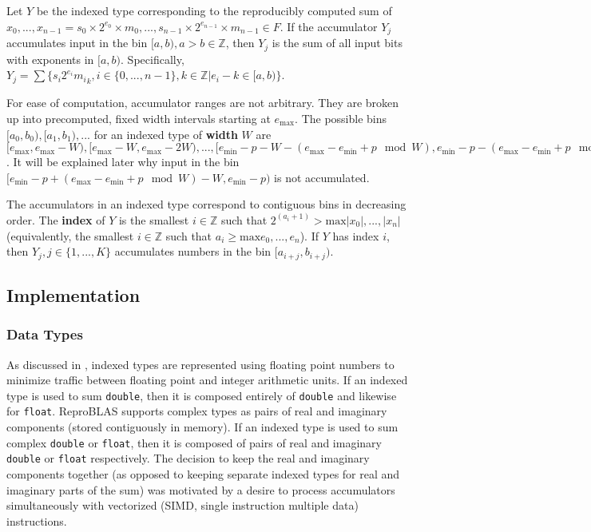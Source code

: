 \documentclass[12pt]{article}
\providecommand{\Z}{\ensuremath{\mathbb{Z}}}
\providecommand{\min}{\ensuremath{\text{min}}}
\providecommand{\max}{\ensuremath{\text{max}}}
\theoremstyle{plain}
\begin{document}
    Let $Y$ be the indexed type corresponding to the reproducibly computed sum of $x_0, ..., x_{n - 1} = s_0 \times 2^{e_0} \times m_0, ..., s_{n - 1} \times 2^{e_{n - 1}} \times m_{n - 1} \in F$.
    If the accumulator $Y_j$ accumulates input in the bin $[a, b), a > b \in \Z$, then $Y_j$ is the sum of all input bits with exponents in $[a, b)$. Specifically, $Y_j = \sum \{s_i2^{e_i}{m_i}_k, i \in \{0, ..., n - 1\}, k \in \Z | e_i - k \in [a, b)\}$.

    For ease of computation, accumulator ranges are not arbitrary. They are broken up into precomputed, fixed width intervals starting at $e_{\max}$. The possible bins $[a_0, b_0), [a_1, b_1), ...$ for an indexed type of \textbf{width} $W$ are $[e_{\max}, e_{\max} - W), [e_{\max} - W, e_{\max} - 2W), ..., [e_{\min} - p - W - (e_{\max} - e_{\min} + p \mod W), e_{\min} - p - (e_{\max} - e_{\min} + p \mod W))$. It will be explained later why input in the bin $[e_{\min} - p + (e_{\max} - e_{\min} + p \mod W) - W, e_{\min} - p)$ is not accumulated.

    The accumulators in an indexed type correspond to contiguous bins in decreasing order. The \textbf{index} of $Y$ is the smallest $i \in \Z$ such that $2^(a_i + 1) > \max{|x_0|, ..., |x_n|}$ (equivalently, the smallest $i \in \Z$ such that $a_i \geq \max{e_0, ..., e_n}$). If $Y$ has index $i$, then $Y_j, j \in \{1, ..., K\}$ accumulates numbers in the bin $[a_{i + j}, b_{i + j})$.
  \subsection{Implementation}
    \subsubsection{Data Types}
      As discussed in \cite{repsum}, indexed types are represented using floating point numbers to minimize traffic between floating point and integer arithmetic units. If an indexed type is used to sum \verb|double|, then it is composed entirely of \verb|double| and likewise for \verb|float|. ReproBLAS supports complex types as pairs of real and imaginary components (stored contiguously in memory). If an indexed type is used to sum complex \verb|double| or \verb|float|, then it is composed of pairs of real and imaginary \verb|double| or \verb|float| respectively. The decision to keep the real and imaginary components together (as opposed to keeping separate indexed types for real and imaginary parts of the sum) was motivated by a desire to process accumulators simultaneously with vectorized (SIMD, single instruction multiple data) instructions.
\end{document}
